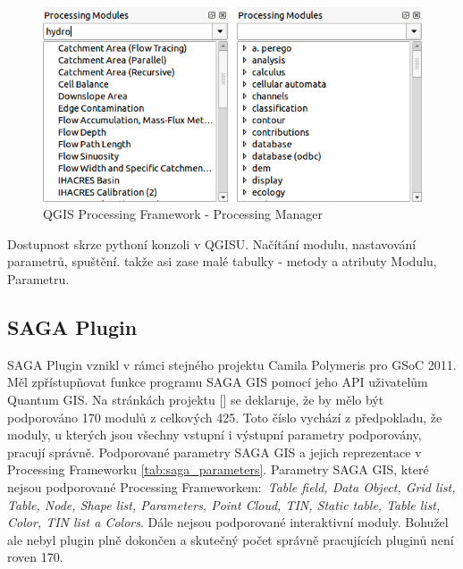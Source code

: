 \begin{figure}
	\centering
	\includegraphics[scale=0.5]{pictures/pf/processing_manager_small}
	\caption{QGIS Processing Framework - Processing Manager}
  	\label{pf:pm}
\end{figure}

{\color{red}Dostupnost skrze pythoní konzoli v QGISU. Načítání modulu, nastavování parametrů, spuštění. takže asi zase malé tabulky - metody a atributy Modulu, Parametru.}


\subsection{SAGA Plugin}
SAGA Plugin vznikl v rámci stejného projektu Camila Polymeris pro GSoC 2011. Měl zpřístupňovat funkce programu SAGA GIS pomocí jeho API uživatelům Quantum GIS. Na stránkách projektu [\cite{pf:supportedModules}] se deklaruje, že by mělo být podporováno 170 modulů z celkových 425. Toto číslo vychází z předpokladu, že moduly, u kterých jsou všechny vstupní i výstupní parametry podporovány, pracují správně. Podporované parametry SAGA GIS a jejich reprezentace v Processing Frameworku \ref{tab:saga_parameters}. Parametry SAGA GIS, které nejsou podporované Processing Frameworkem$:$ \textit{Table field, Data Object, Grid list, Table, Node, Shape list, Parameters, Point Cloud, TIN, Static table, Table list, Color, TIN list a Colors}. Dále nejsou podporované interaktivní moduly. Bohužel ale nebyl plugin plně dokončen a skutečný počet správně pracujících pluginů není roven 170. \\

